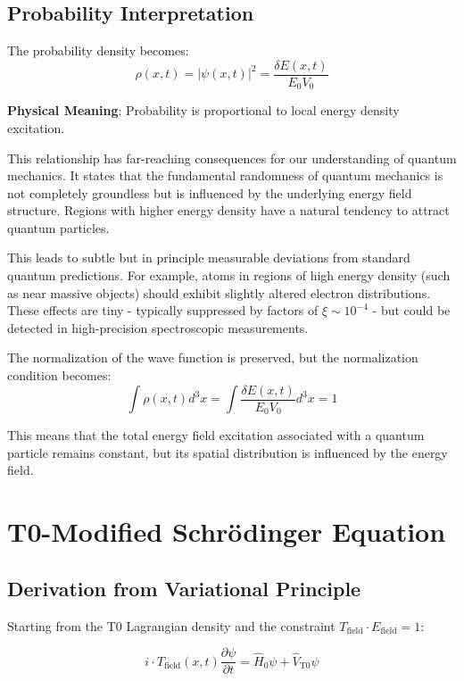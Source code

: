 \documentclass[12pt,a4paper]{article}
\newcommand{\deltaE}{\delta E}
\newcommand{\xipar}{\xi}
\theoremstyle{definition}
\theoremstyle{remark}
\begin{document}
	\subsection{Probability Interpretation}
	
	The probability density becomes:
	\begin{equation}
		\rho(x,t) = |\psi(x,t)|^2 = \frac{\deltaE(x,t)}{E_0 V_0}
		\label{eq:probability_density}
	\end{equation}
	
	\textbf{Physical Meaning}: Probability is proportional to local energy density excitation.
	
	This relationship has far-reaching consequences for our understanding of quantum mechanics. It states that the fundamental randomness of quantum mechanics is not completely groundless but is influenced by the underlying energy field structure. Regions with higher energy density have a natural tendency to attract quantum particles.
	
	This leads to subtle but in principle measurable deviations from standard quantum predictions. For example, atoms in regions of high energy density (such as near massive objects) should exhibit slightly altered electron distributions. These effects are tiny - typically suppressed by factors of $\xipar \sim 10^{-4}$ - but could be detected in high-precision spectroscopic measurements.
	
	The normalization of the wave function is preserved, but the normalization condition becomes:
	$$\int \rho(x,t) d^3x = \int \frac{\deltaE(x,t)}{E_0 V_0} d^3x = 1$$
	
	This means that the total energy field excitation associated with a quantum particle remains constant, but its spatial distribution is influenced by the energy field.
	
	\section{T0-Modified Schrödinger Equation}
	
	\subsection{Derivation from Variational Principle}
	
	Starting from the T0 Lagrangian density and the constraint $T_{\text{field}} \cdot E_{\text{field}} = 1$:
	
	\begin{equation}
		\boxed{i \cdot T_{\text{field}}(x,t) \frac{\partial\psi}{\partial t} = \hat{H}_0 \psi + \hat{V}_{\text{T0}} \psi}
		\label{eq:t0_schrodinger_general}
	\end{equation}
	
\end{document}
